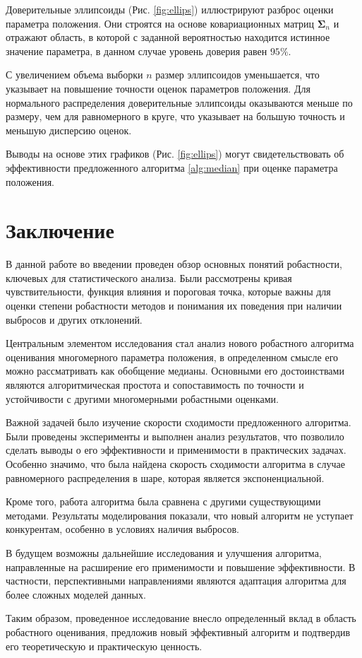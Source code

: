 \documentclass[specialist,
substylefile = spbu.rtx,
               subf,href,colorlinks=true, 12pt]{disser}
\begin{document}
Доверительные эллипсоиды  (Рис. \ref{fig:ellips}) иллюстрируют разброс оценки параметра положения. 
Они строятся на основе ковариационных матриц $\mathbf{\Sigma}_n$  и отражают область, в которой с заданной вероятностью находится истинное значение параметра, в данном случае уровень доверия равен $95\%.$

 С увеличением объема выборки $n$ размер эллипсоидов уменьшается, что указывает на повышение точности оценок параметров положения. Для нормального распределения доверительные эллипсоиды оказываются меньше по размеру, чем для равномерного в круге, что указывает на большую точность и меньшую дисперсию оценок. 
 
Выводы на основе этих графиков (Рис. \ref{fig:ellips}) могут свидетельствовать об эффективности предложенного алгоритма \ref{alg:median} при оценке параметра положения.

\chapter{Заключение}

В данной работе во введении проведен обзор основных понятий робастности, ключевых для статистического анализа. Были рассмотрены кривая чувствительности, функция влияния и пороговая точка, которые важны для оценки степени робастности методов и понимания их поведения при наличии выбросов и других отклонений.

Центральным элементом исследования стал анализ нового робастного алгоритма оценивания многомерного параметра положения, в определенном смысле его можно рассматривать как обобщение медианы. Основными его достоинствами являются алгоритмическая простота и сопоставимость по точности и устойчивости с другими многомерными робастными оценками.

Важной задачей было изучение скорости сходимости предложенного алгоритма. Были проведены эксперименты и выполнен анализ результатов, что позволило сделать выводы о его эффективности и применимости в практических задачах. Особенно значимо, что была найдена скорость сходимости алгоритма в случае равномерного распределения в шаре, которая является экспоненциальной. 

Кроме того, работа алгоритма была сравнена с другими существующими методами. Результаты моделирования показали, что новый алгоритм не уступает конкурентам, особенно в условиях наличия выбросов.

В будущем возможны дальнейшие исследования и улучшения алгоритма, направленные на расширение его применимости и повышение эффективности. В частности, перспективными направлениями являются адаптация алгоритма для более сложных моделей данных.

Таким образом, проведенное исследование внесло определенный вклад в область робастного оценивания, предложив новый эффективный алгоритм и подтвердив его теоретическую и практическую ценность. 



%

\end{document}

